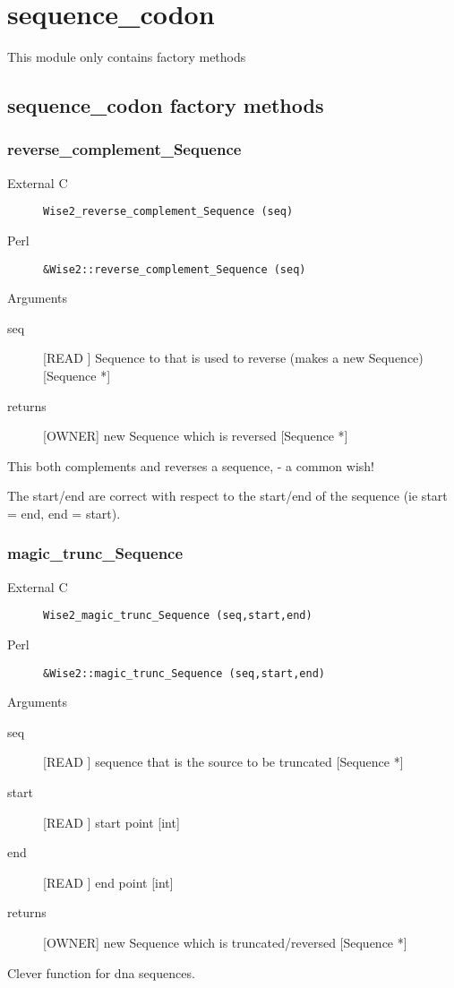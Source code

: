 \section{sequence_codon}
\label{module_sequence_codon}
This module only contains factory methods

\subsection{sequence_codon factory methods}
\subsubsection{reverse_complement_Sequence}
\begin{description}
\item[External C] {\tt Wise2_reverse_complement_Sequence (seq)}
\item[Perl] {\tt &Wise2::reverse_complement_Sequence (seq)}

\end{description}
Arguments
\begin{description}
\item[seq] [READ ] Sequence to that is used to reverse (makes a new Sequence) [Sequence *]
\item[returns] [OWNER] new Sequence which is reversed [Sequence *]
\end{description}
This both complements and reverses a sequence,
- a common wish!


The start/end are correct with respect to the start/end
of the sequence (ie start = end, end = start).


\subsubsection{magic_trunc_Sequence}
\begin{description}
\item[External C] {\tt Wise2_magic_trunc_Sequence (seq,start,end)}
\item[Perl] {\tt &Wise2::magic_trunc_Sequence (seq,start,end)}

\end{description}
Arguments
\begin{description}
\item[seq] [READ ] sequence that is the source to be truncated [Sequence *]
\item[start] [READ ] start point [int]
\item[end] [READ ] end point [int]
\item[returns] [OWNER] new Sequence which is truncated/reversed [Sequence *]
\end{description}
Clever function for dna sequences.


